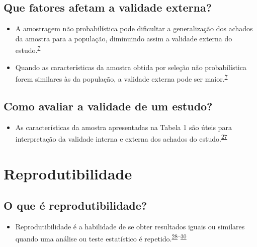 \documentclass[
  a4paper,
]{book}
\providecommand{\tightlist}{%
  \setlength{\itemsep}{0pt}\setlength{\parskip}{0pt}}
\begin{document}
\hypertarget{que-fatores-afetam-a-validade-externa}{%
\subsection{Que fatores afetam a validade externa?}\label{que-fatores-afetam-a-validade-externa}}

\begin{itemize}
\item
  A amostragem não probabilística pode dificultar a generalização dos achados da amostra para a população, diminuindo assim a validade externa do estudo.\textsuperscript{\protect\hyperlink{ref-Banerjee2010}{7}}
\item
  Quando as características da amostra obtida por seleção não probabilística forem similares às da população, a validade externa pode ser maior.\textsuperscript{\protect\hyperlink{ref-Banerjee2010}{7}}
\end{itemize}

\hypertarget{como-avaliar-a-validade-de-um-estudo}{%
\subsection{Como avaliar a validade de um estudo?}\label{como-avaliar-a-validade-de-um-estudo}}

\begin{itemize}
\tightlist
\item
  As características da amostra apresentadas na Tabela 1 são úteis para interpretação da validade interna e externa dos achados do estudo.\textsuperscript{\protect\hyperlink{ref-Westreich2013}{27}}
\end{itemize}

\hypertarget{reprodutibilidade}{%
\section{Reprodutibilidade}\label{reprodutibilidade}}

\hypertarget{o-que-uxe9-reprodutibilidade}{%
\subsection{O que é reprodutibilidade?}\label{o-que-uxe9-reprodutibilidade}}

\begin{itemize}
\tightlist
\item
  Reprodutibilidade é a habilidade de se obter resultados iguais ou similares quando uma análise ou teste estatístico é repetido.\textsuperscript{\protect\hyperlink{ref-resnik2016}{28}--\protect\hyperlink{ref-mair2016}{30}}
\end{itemize}
\end{document}
